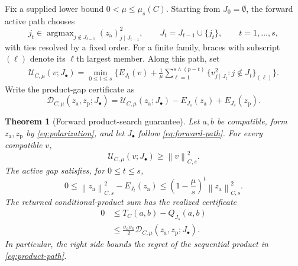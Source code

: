 \documentclass[a4paper,11pt,english]{article}
\newtheorem{theorem}{Theorem}[section]
\newcommand{\norm}[1]{\left\lVert #1\right\rVert}
\begin{document}
Fix a supplied lower bound $0<\mu\le\mu_s(C)$.  Starting from
$J_0=\emptyset$, the forward active path chooses
\begin{equation}\label{eq:forward-path}
        j_t\in\mathop{\arg\max}_{j\notin J_{t-1}}
        (z_{\mathrm a})_{j\mid J_{t-1}}^2,
        \qquad
        J_t=J_{t-1}\cup\{j_t\},
        \qquad t=1,\ldots,s,
\end{equation}
with ties resolved by a fixed order.  For a finite family, braces with
subscript $(\ell)$ denote its $\ell$th largest member.  Along this path,
set
\begin{equation}\label{eq:projection-upper-certificate}
\begin{split}
        \mathcal U_{C,\mu}(v;J_\bullet)
        =\min_{0\le t\le s}\bigg\{
        E_{J_t}(v)
        +\frac1\mu
        \sum_{\ell=1}^{s\wedge(p-t)}
        \{v_{j\mid J_t}^2:j\notin J_t\}_{(\ell)}
        \bigg\}.
\end{split}
\end{equation}
Write the product-gap certificate as
\begin{equation}\label{eq:product-gap-certificate}
        \mathcal D_{C,\mu}(z_{\mathrm a},z_{\mathrm p};J_\bullet)
        =\mathcal U_{C,\mu}(z_{\mathrm a};J_\bullet)-E_{J_s}(z_{\mathrm a})+E_{J_s}(z_{\mathrm p}).
\end{equation}

\begin{theorem}[Forward product-search guarantee]
\label{thm:projection-certified-products}
Let $a,b$ be compatible, form $z_{\mathrm a},z_{\mathrm p}$ by
\eqref{eq:polarization}, and let $J_\bullet$ follow
\eqref{eq:forward-path}.  For every compatible $v$,
\begin{equation}\label{eq:projection-upper-bound}
        \mathcal U_{C,\mu}(v;J_\bullet)\ge\norm{v}_{C,s}^2.
\end{equation}
The active gap satisfies, for $0\le t\le s$,
\begin{equation}\label{eq:forward-active-gap}
        0\le\norm{z_{\mathrm a}}_{C,s}^2-E_{J_t}(z_{\mathrm a})
        \le\left(1-\frac\mu s\right)^t
        \norm{z_{\mathrm a}}_{C,s}^2.
\end{equation}
The returned conditional-product sum has the realized certificate
\begin{equation}\label{eq:product-certificate}
\begin{split}
        0&\le T_C(a,b)-Q_{J_s}(a,b)\\
        &\le\frac{\sigma_a\sigma_b}{2}
        \mathcal D_{C,\mu}(z_{\mathrm a},z_{\mathrm p};J_\bullet).
\end{split}
\end{equation}
In particular, the right side bounds the regret of the sequential product
in \eqref{eq:product-path}.
\end{theorem}
\end{document}
